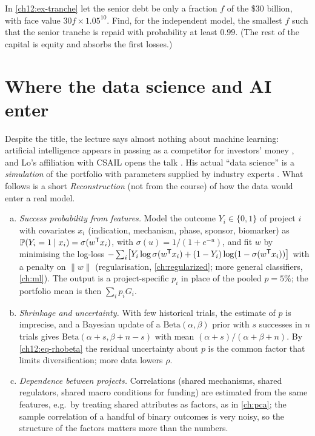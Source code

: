 \begin{paracol}{2}
\begin{exercise}
In \cref{ch12:ex-tranche} let the senior debt be only a fraction $f$ of the \$30 billion, with face value $30f\times1.05^{10}$.
Find, for the independent model, the smallest $f$ such that the senior tranche is repaid with probability at least $0.99$.
(The rest of the capital is equity and absorbs the first losses.)
\end{exercise}

\section{Where the data science and AI enter}\label{ch12:sec-ml}

Despite the title, the lecture says almost nothing about machine learning: artificial intelligence appears in
passing as a competitor for investors' money , and Lo's affiliation with CSAIL
opens the talk . His actual ``data science'' is a \emph{simulation}
of the portfolio with parameters supplied by industry experts . What follows is a
short \emph{Reconstruction} (not from the course) of how the data would enter a real model.

\begin{enumerate}[(a)]
  \item \emph{Success probability from features.} Model the outcome $Y_i\in\{0,1\}$ of project $i$ with covariates $x_i$
        (indication, mechanism, phase, sponsor, biomarker) as $\mathbb{P}(Y_i=1\mid x_i)=\sigma(w^{\mathsf T} x_i)$, with
        $\sigma(u)=1/(1+e^{-u})$, and fit $w$ by minimising the log-loss
        $-\sum_i\bigl[Y_i\log\sigma(w^{\mathsf T} x_i)+(1-Y_i)\log(1-\sigma(w^{\mathsf T} x_i))\bigr]$ with a penalty on $\|w\|$
        (regularisation, \cref{ch:regularized}; more general classifiers, \cref{ch:ml}). The output is a
        project-specific $p_i$ in place of the pooled $p=5\%$; the portfolio mean is then $\sum_ip_iG_i$.
  \item \emph{Shrinkage and uncertainty.} With few historical trials, the estimate of $p$ is imprecise, and a Bayesian update
        of a $\mathrm{Beta}(\alpha,\beta)$ prior with $s$ successes in $n$ trials gives
        $\mathrm{Beta}(\alpha+s,\beta+n-s)$ with mean $(\alpha+s)/(\alpha+\beta+n)$. By \eqref{ch12:eq-rhobeta}
        the residual uncertainty about $p$ is the common factor that limits diversification; more data
        lowers $\rho$.
  \item \emph{Dependence between projects.} Correlations (shared mechanisms, shared regulators, shared
        macro conditions for funding) are estimated from the same features, e.g.\ by treating shared
        attributes as factors, as in \cref{ch:pca}; the sample correlation of a handful of binary outcomes
        is very noisy, so the structure of the factors matters more than the numbers.
\end{enumerate}


\end{paracol}
